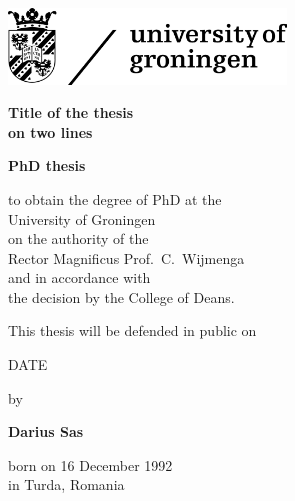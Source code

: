 \pagestyle{empty}
\thispagestyle{empty}

\large
\vspace*{-3cm}

\hspace*{-0.5cm}\includegraphics[width=7.38cm]{Figures/rugr_logoen_zwart_rgb.jpg}

\begin{center}

\vspace{1cm}

{\fontsize{29pt}{34.8pt}\selectfont \textbf{Title of the thesis}\\\textbf{on two lines}}
% 


\vspace{2.5cm}

\textbf{\Large{PhD thesis}}

\vspace{1.6cm}

to obtain the degree of PhD at the\\
University of Groningen\\
on the authority of the\\
Rector Magnificus Prof.\ C.~Wijmenga\\
and in accordance with\\
the decision by the College of Deans.

\vspace{0.4cm}

This thesis will be defended in public on

\vspace{0.4cm}

DATE

\vspace{1cm}

by

\vspace{1cm}

\textbf{\Large{Darius Sas}}\\

\vspace{0.4cm}

born on 16 December 1992\\
in Turda, Romania
\end{center}



